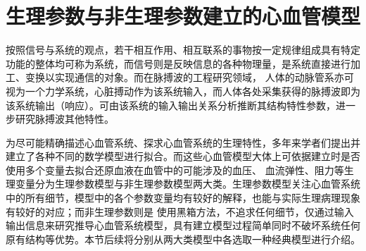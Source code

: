 \section{生理参数与非生理参数建立的心血管模型}
按照信号与系统的观点，若干相互作用、相互联系的事物按一定规律组成具有特定功能的整体均可称为系统，而信号则是反映信息的各种物理量，是系统直接进行加工、变换以实现通信的对象。而在脉搏波的工程研究领域，
人体的动脉管系亦可视为一个力学系统，心脏搏动作为该系统输入，而人体各处采集获得的脉搏波即为该系统输出（响应）。可由该系统的输入输出关系分析推断其结构特性参数，进一步研究脉搏波其他特性。\cite{PPGYY}

为尽可能精确描述心血管系统、探求心血管系统的生理特性，多年来学者们提出并建立了各种不同的数学模型进行拟合。而这些心血管模型大体上可依据建立时是否使用多个变量去拟合还原血液在血管中的可能涉及的血压、
血流弹性、阻力等生理变量分为生理参数模型与非生理参数模型两大类\cite{PPGYY}。生理参数模型关注心血管系统中的所有细节，模型中的各个参数变量均有较好的解释，也能与实际生理病理现象有较好的对应；而非生理参数则是
使用黑箱方法，不追求任何细节，仅通过输入输出信息来研究推导心血管系统模型，具有建立模型过程简单同时不破坏系统任何原有结构等优势。本节后续将分别从两大类模型中各选取一种经典模型进行介绍。
